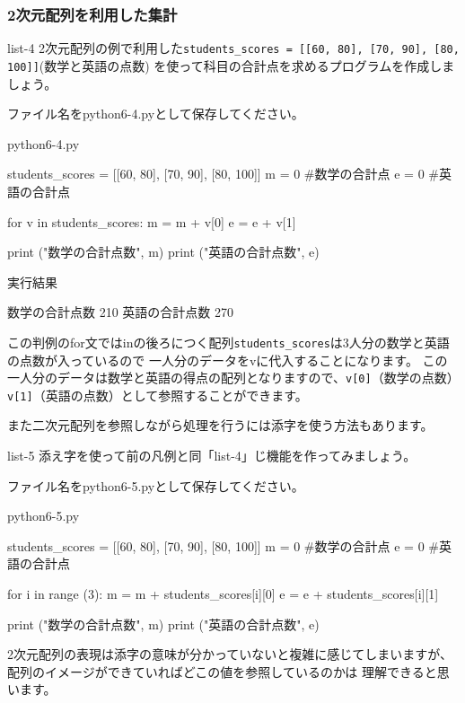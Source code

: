 \documentclass[11pt,a4paper,dvipdfmx,titlepage]{jsreport}
\begin{document}
\subsubsection{2次元配列を利用した集計}
\begin{pabox}{list-4}
2次元配列の例で利用した{\tt students\_scores = [[60, 80], [70, 90], [80, 100]]}(数学と英語の点数)
を使って科目の合計点を求めるプログラムを作成しましょう。

ファイル名をpython6-4.pyとして保存してください。
\begin{legbox}{python6-4.py}
\begin{listing}{1}
students_scores = [[60, 80], [70, 90], [80, 100]]
m = 0 #数学の合計点
e = 0 #英語の合計点

for v in students_scores:
    m = m + v[0]
    e = e + v[1]

print ("数学の合計点数", m)
print ("英語の合計点数", e)
\end{listing}
実行結果
\begin{listing}{1}
数学の合計点数 210
英語の合計点数 270
\end{listing}
\end{legbox}
この判例のfor文ではinの後ろにつく配列{\tt students\_scores}は3人分の数学と英語の点数が入っているので
一人分のデータをvに代入することになります。
この一人分のデータは数学と英語の得点の配列となりますので、{\tt v[0]}（数学の点数）{\tt v[1]}（英語の点数）として参照することができます。
\end{pabox}
また二次元配列を参照しながら処理を行うには添字を使う方法もあります。
\begin{pabox}{list-5}
添え字を使って前の凡例と同「list-4」じ機能を作ってみましょう。

ファイル名をpython6-5.pyとして保存してください。
\begin{legbox}{python6-5.py}
\begin{listing}{1}
students_scores = [[60, 80], [70, 90], [80, 100]]
m = 0 #数学の合計点
e = 0 #英語の合計点

for i in range (3):
    m = m + students_scores[i][0]
    e = e + students_scores[i][1]

print ("数学の合計点数", m)
print ("英語の合計点数", e)
\end{listing}
\end{legbox}
2次元配列の表現は添字の意味が分かっていないと複雑に感じてしまいますが、配列のイメージができていればどこの値を参照しているのかは
理解できると思います。
\end{pabox}
\end{document}
